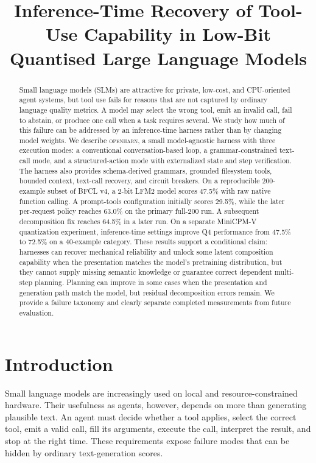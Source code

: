 \documentclass[conference]{IEEEtran}
\title{Inference-Time Recovery of Tool-Use Capability in Low-Bit Quantised Large Language Models}
\author{
\IEEEauthorblockN{Nitesh Sharma}
\IEEEauthorblockA{Independent Researcher}
}
\newcommand{\openharn}{\textsc{openharn}}
\begin{document}
\maketitle

\begin{abstract}
Small language models (SLMs) are attractive for private, low-cost, and CPU-oriented agent
systems, but tool use fails for reasons that are not captured by ordinary language quality
metrics. A model may select the wrong tool, emit an invalid call, fail to abstain, or produce
one call when a task requires several. We study how much of this failure can be addressed by
an inference-time harness rather than by changing model weights. We describe \openharn, a
small model-agnostic harness with three execution modes: a conventional conversation-based
loop, a grammar-constrained text-call mode, and a structured-action mode with externalized
state and step verification. The harness also provides schema-derived grammars, grounded
filesystem tools, bounded context, text-call recovery, and circuit breakers. On a reproducible
200-example subset of BFCL v4, a 2-bit LFM2 model scores 47.5\% with raw native function
calling. A prompt-tools configuration initially scores 29.5\%, while the later per-request
policy reaches 63.0\% on the primary full-200 run. A subsequent decomposition fix reaches
64.5\% in a later run. On a
separate MiniCPM-V quantization experiment, inference-time settings improve Q4 performance
from 47.5\% to 72.5\% on a 40-example category. These results support a conditional claim:
harnesses can recover mechanical reliability and unlock some latent composition capability when
the presentation matches the model's pretraining distribution, but they cannot supply missing
semantic knowledge or guarantee correct dependent multi-step planning. Planning can improve in
some cases when the presentation and generation path match the model, but residual decomposition
errors remain. We provide a failure taxonomy and clearly separate completed measurements from
future evaluation.
\end{abstract}

\section{Introduction}

Small language models are increasingly used on local and resource-constrained hardware.
Their usefulness as agents, however, depends on more than generating plausible text. An agent
must decide whether a tool applies, select the correct tool, emit a valid call, fill its
arguments, execute the call, interpret the result, and stop at the right time. These
requirements expose failure modes that can be hidden by ordinary text-generation scores.
\end{document}

